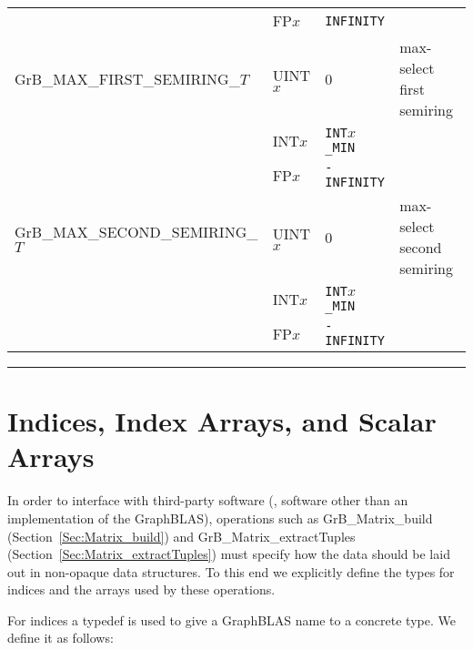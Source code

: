 \begin{table}
\begin{threeparttable}
\begin{tabular}{l|l|l|l}
                                    & {\sf FP$x$}              & {\tt INFINITY}    &                 \\
{\sf GrB\_MAX\_FIRST\_SEMIRING\_$T$}  & {\sf UINT$x$}            & 0                 & max-select first  semiring     \\
                                    & {\sf INT$x$}             & {\tt INT$x$\_MIN} &                 \\
                                    & {\sf FP$x$}              & {\tt -INFINITY}   &                 \\
{\sf GrB\_MAX\_SECOND\_SEMIRING\_$T$} & {\sf UINT$x$}            & 0                 & max-select second semiring     \\
                                    & {\sf INT$x$}             & {\tt INT$x$\_MIN} &                 \\
                                    & {\sf FP$x$}              & {\tt -INFINITY}   &                 \\
\end{tabular}

\hrule
{}
\end{threeparttable}
\end{table}

\section{Indices, Index Arrays, and Scalar Arrays}

In order to interface with third-party software (\ie, software other than
an implementation of the GraphBLAS), operations 
such as {\sf GrB\_Matrix\_build} (Section~\ref{Sec:Matrix_build}) and
{\sf GrB\_Matrix\_extractTuples} (Section~\ref{Sec:Matrix_extractTuples}) must specify
how the data should be laid out in  non-opaque data structures.  To 
this end we explicitly define the types for indices and the arrays 
used by these operations.

For indices a {\sf typedef} is used to give a GraphBLAS name to a concrete type. We define it as follows:

